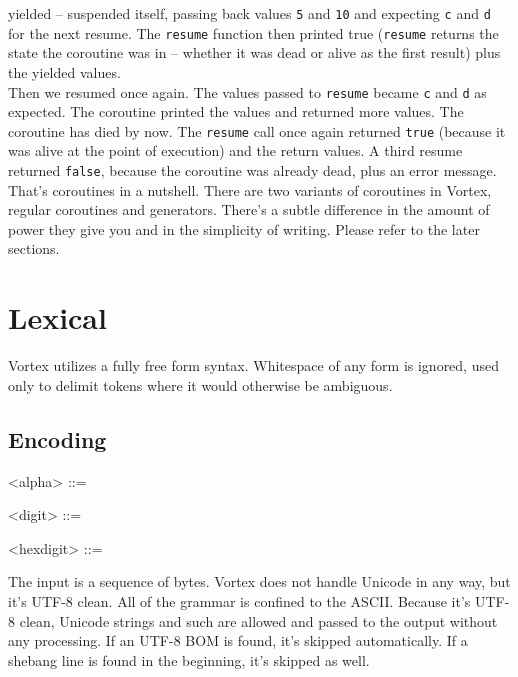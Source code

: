 \documentclass{article}
\newenvironment{bnf}
{
\begin{mdframed}
\begin{grammar}
}
{
\end{grammar}
\end{mdframed}
}
\begin{document}
yielded -- suspended itself, passing back values \verb|5| and \verb|10|
and expecting \verb|c| and \verb|d| for the next resume. The \verb|resume|
function then printed true (\verb|resume| returns the state the coroutine
was in -- whether it was dead or alive as the first result) plus the
yielded values.\\
Then we resumed once again. The values passed to \verb|resume| became
\verb|c| and \verb|d| as expected. The coroutine printed the values and
returned more values. The coroutine has died by now. The \verb|resume| call
once again returned \verb|true| (because it was alive at the point of
execution) and the return values. A third resume returned \verb|false|,
because the coroutine was already dead, plus an error message.\\
That's coroutines in a nutshell. There are two variants of coroutines
in Vortex, regular coroutines and generators. There's a subtle difference
in the amount of power they give you and in the simplicity of writing.
Please refer to the later sections.
\section{Lexical}
Vortex utilizes a fully free form syntax. Whitespace of any form is ignored,
used only to delimit tokens where it would otherwise be ambiguous.
\subsection{Encoding}
\begin{bnf}
<alpha> ::= 

<digit> ::= 

<hexdigit> ::= 
\end{bnf}
The input is a sequence of bytes. Vortex does not handle Unicode in any way,
but it's UTF-8 clean. All of the grammar is confined to the ASCII. Because
it's UTF-8 clean, Unicode strings and such are allowed and passed to the
output without any processing. If an UTF-8 BOM is found, it's skipped
automatically. If a shebang line is found in the beginning, it's skipped
as well.
\end{document}
